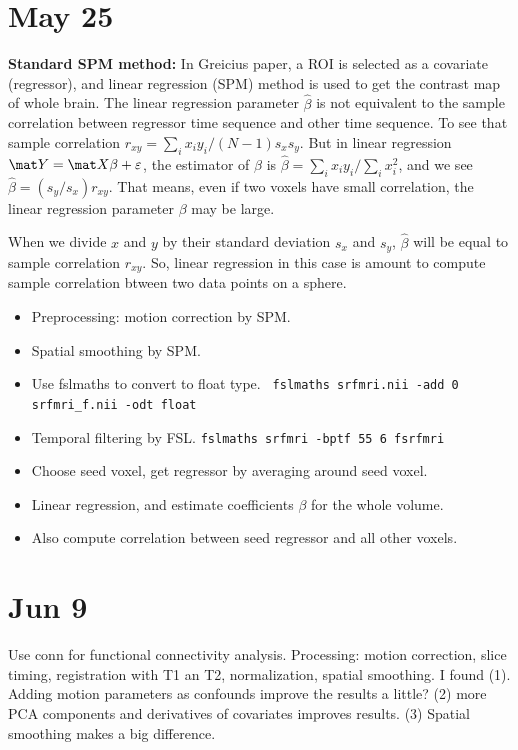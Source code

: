 \documentclass[12pt]{article}
\begin{document}
\section{May 25}
\textbf{Standard SPM method: } In Greicius paper, a ROI is selected as a covariate (regressor), and linear regression (SPM) method is used to get the contrast map of whole brain. The linear regression parameter $\hat \beta$ is not equivalent to the sample correlation between regressor time sequence and other time sequence. To see that sample correlation $r_{xy} = \sum_i x_i y_i /(N-1) s_x s_y$. But in linear regression $\mat Y = \mat X \beta + \varepsilon$, the estimator of $\beta$ is $\hat \beta = \sum_i x_i y_i / \sum_i x_i^2$, and we see $\hat \beta = (s_y/s_x) r_{xy}$. That means, even if two voxels have small correlation, the linear regression parameter $\beta$ may be large. 

When we divide $x$ and $y$ by their standard deviation $s_x$ and $s_y$, $\hat \beta $ will be equal to sample correlation $r_{xy}$. So, linear regression in this case is amount to compute sample correlation btween two data points on a sphere.

\begin{itemize}
\item Preprocessing: motion correction by SPM.
\item Spatial smoothing by SPM. 
\item Use \textsf{fslmaths} to convert to float type. \texttt{ fslmaths srfmri.nii -add 0 srfmri\_f.nii -odt float}
\item Temporal filtering by FSL. \texttt{fslmaths srfmri  -bptf 55 6 fsrfmri}
\item Choose seed voxel, get regressor by averaging around seed voxel. 
\item Linear regression, and estimate coefficients $\beta$ for the whole volume.
\item Also compute correlation between seed regressor and all other voxels.
\end{itemize}

\section{Jun 9}
Use \textsf{conn} for functional connectivity analysis. Processing: motion correction, slice timing, registration with T1 an T2, normalization, spatial smoothing. I found (1). Adding motion parameters as confounds improve the results a little? (2) more PCA components and derivatives of covariates improves results. (3) Spatial smoothing makes a big difference. 
\end{document}
